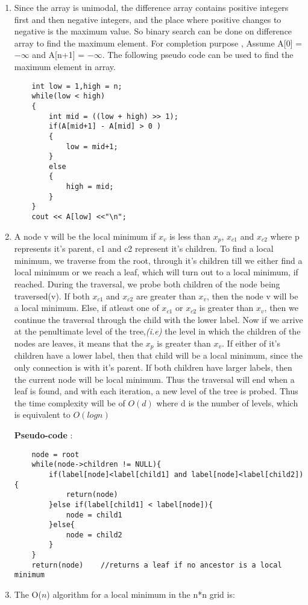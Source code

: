 \documentclass[12pt]{article}
\begin{document}
\begin{enumerate}
    \item 
    Since the array is unimodal, the difference array contains positive integers first and then negative integers, and the place where positive changes to negative is the maximum value.
    So binary search can be done on difference array to find the maximum element.
    For completion purpose , Assume A[0] = $-\infty$ and A[n+1] = $-\infty$.
    The following pseudo code can be used to find the maximum element in array.
    \begin{verbatim}
    int low = 1,high = n;
    while(low < high)
    {
        int mid = ((low + high) >> 1);
        if(A[mid+1] - A[mid] > 0 )
        {
            low = mid+1;
        }
        else
        {
            high = mid;
        }
    }
    cout << A[low] <<"\n"; 
    \end{verbatim}
    \item A node v will be the local minimum if $x_v$ is less than $x_p$, $x_{c1}$ and $x_{c2}$ where p represents it's parent, c1 and c2 represent it's children. To find a local minimum, we traverse from the root, through it's children till we either find a local minimum or we reach a leaf, which will turn out to a local minimum, if reached. During the traversal, we probe both children of the node being traversed(v). If both $x_{c1}$ and $x_{c2}$ are greater than $x_v$, then the node v will be a local minimum. Else, if atleast one of $x_{c1}$ or $x_{c2}$ is greater than $x_v$, then we continue the traversal through the child with the lower label. Now if we arrive at the penultimate level of the tree,\textit{(i.e)} the level in which the children of the nodes are leaves, it means that the $x_p$ is greater than $x_v$. If either of it's children have a lower label, then that child will be a local minimum, since the only connection is with it's parent. If both children have larger labels, then the current node will be local minimum. Thus the traversal will end when a leaf is found, and with each iteration, a new level of the tree is probed. Thus the time complexity will be of $O(d)$ where d is the number of levels, which is equivalent to $O(logn)$
    
    \textbf{Pseudo-code} : 
    \begin{verbatim}
    node = root 
    while(node->children != NULL){
        if(label[node]<label[child1] and label[node]<label[child2]){         
            return(node)
        }else if(label[child1] < label[node]){
            node = child1
        }else{
            node = child2
        }
    }
    return(node)    //returns a leaf if no ancestor is a local minimum
    \end{verbatim}
    \item %
    The O($n$) algorithm for a local minimum in the n*n grid is:
    

\end{enumerate}
\end{document}
